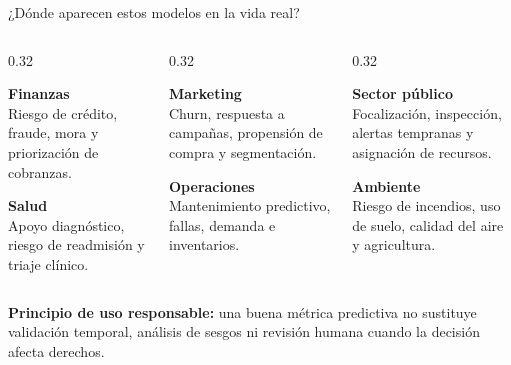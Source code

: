 \documentclass[aspectratio=169,11pt,table]{beamer}
\begin{document}
\begin{frame}{¿Dónde aparecen estos modelos en la vida real?}
\footnotesize
\begin{columns}[T,onlytextwidth]
\begin{column}{0.32\textwidth}
\begin{ccdebox}
\centering
\textbf{Finanzas}\\[0.18cm]
\footnotesize
Riesgo de crédito, fraude, mora y priorización de cobranzas.
\end{ccdebox}
\vspace{0.10cm}
\begin{ccdebox}
\centering
\textbf{Salud}\\[0.18cm]
\footnotesize
Apoyo diagnóstico, riesgo de readmisión y triaje clínico.
\end{ccdebox}
\end{column}
\begin{column}{0.32\textwidth}
\begin{ccdebox}
\centering
\textbf{Marketing}\\[0.18cm]
\footnotesize
Churn, respuesta a campañas, propensión de compra y segmentación.
\end{ccdebox}
\vspace{0.10cm}
\begin{ccdebox}
\centering
\textbf{Operaciones}\\[0.18cm]
\footnotesize
Mantenimiento predictivo, fallas, demanda e inventarios.
\end{ccdebox}
\end{column}
\begin{column}{0.32\textwidth}
\begin{ccdebox}
\centering
\textbf{Sector público}\\[0.18cm]
\footnotesize
Focalización, inspección, alertas tempranas y asignación de recursos.
\end{ccdebox}
\vspace{0.10cm}
\begin{ccdebox}
\centering
\textbf{Ambiente}\\[0.18cm]
\footnotesize
Riesgo de incendios, uso de suelo, calidad del aire y agricultura.
\end{ccdebox}
\end{column}
\end{columns}
\vspace{0.14cm}
\begin{keybox}
\textbf{Principio de uso responsable:} una buena métrica predictiva no sustituye validación temporal, análisis de sesgos ni revisión humana cuando la decisión afecta derechos.
\end{keybox}
\end{frame}
\end{document}
